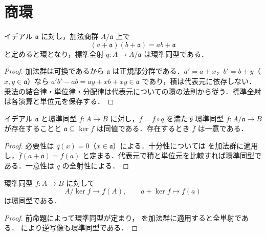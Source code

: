 \section{商環}
\begin{prop}[商環]
イデアル $\mathfrak a$ に対し，加法商群 $A/\mathfrak a$ 上で
\[
(a+\mathfrak a)(b+\mathfrak a)=ab+\mathfrak a
\]
と定めると環となり，標準全射 $q:A\to A/\mathfrak a$ は環準同型である．
\end{prop}
\begin{proof}
加法群は可換であるから $\mathfrak a$ は正規部分群である．$a'=a+x$，$b'=b+y$（$x,y\in\mathfrak a$）なら
$a'b'-ab=ay+xb+xy\in\mathfrak a$ であり，積は代表元に依存しない．乗法の結合律・単位律・分配律は代表元についての環の法則から従う．標準全射は各演算と単位元を保存する．
\end{proof}
\begin{prop}[商環の普遍性]
イデアル $\mathfrak a$ と環準同型 $f:A\to B$ に対し，$f=\bar f\circ q$ を満たす環準同型 $\bar f:A/\mathfrak a\to B$ が存在することと $\mathfrak a\subseteq\ker f$ は同値である．存在するとき $\bar f$ は一意である．
\end{prop}
\begin{proof}
必要性は $q(x)=0$（$x\in\mathfrak a$）による．十分性については  を加法群に適用し，$\bar f(a+\mathfrak a)=f(a)$ と定まる．代表元で積と単位元を比較すれば環準同型である．一意性は $q$ の全射性による．
\end{proof}
\begin{prop}[環準同型の第一同型定理]
環準同型 $f:A\to B$ に対して
\[
 A/\ker f\longrightarrow f(A),\qquad a+\ker f\longmapsto f(a)
\]
は環同型である．
\end{prop}
\begin{proof}
前命題によって環準同型が定まり， を加法群に適用すると全単射である． により逆写像も環準同型である．
\end{proof}
